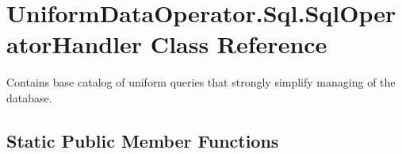 \hypertarget{class_uniform_data_operator_1_1_sql_1_1_sql_operator_handler}{}\section{Uniform\+Data\+Operator.\+Sql.\+Sql\+Operator\+Handler Class Reference}
\label{class_uniform_data_operator_1_1_sql_1_1_sql_operator_handler}


Contains base catalog of uniform queries that strongly simplify managing of the database.  


\subsection*{Static Public Member Functions}
